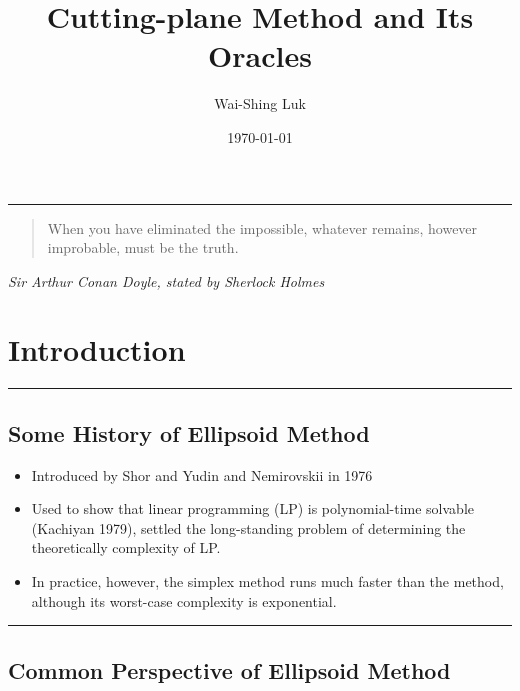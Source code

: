 \documentclass[]{article}
\title{Cutting-plane Method and Its Oracles}
\author{Wai-Shing Luk}
\date{\today}
\begin{document}
\maketitle

\listoffigures
\begin{center}\rule{0.5\linewidth}{\linethickness}\end{center}

\begin{quote}
When you have eliminated the impossible, whatever remains, however
improbable, must be the truth.
\end{quote}

\emph{Sir Arthur Conan Doyle, stated by Sherlock Holmes}

\hypertarget{introduction}{%
\section{Introduction}\label{introduction}}

\begin{center}\rule{0.5\linewidth}{\linethickness}\end{center}

\hypertarget{some-history-of-ellipsoid-method}{%
\subsection{Some History of Ellipsoid
Method}\label{some-history-of-ellipsoid-method}}

\begin{itemize}
\item
  Introduced by Shor and Yudin and Nemirovskii in 1976
\item
  Used to show that linear programming (LP) is polynomial-time solvable
  (Kachiyan 1979), settled the long-standing problem of determining the
  theoretically complexity of LP.
\item
  In practice, however, the simplex method runs much faster than the
  method, although its worst-case complexity is exponential.
\end{itemize}

\begin{center}\rule{0.5\linewidth}{\linethickness}\end{center}

\hypertarget{common-perspective-of-ellipsoid-method}{%
\subsection{Common Perspective of Ellipsoid
Method}\label{common-perspective-of-ellipsoid-method}}
\end{document}
